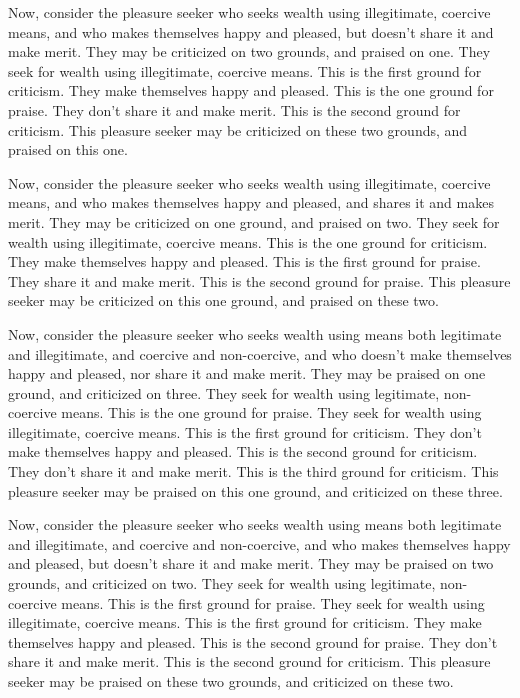 \documentclass[12pt,openany]{book}%
\begin{document}
Now, consider the pleasure seeker who seeks wealth using illegitimate, coercive means, and who makes themselves happy and pleased, but doesn’t share it and make merit. They may be criticized on two grounds, and praised on one. They seek for wealth using illegitimate, coercive means. This is the first ground for criticism. They make themselves happy and pleased. This is the one ground for praise. They don’t share it and make merit. This is the second ground for criticism. This pleasure seeker may be criticized on these two grounds, and praised on this one. 

Now, consider the pleasure seeker who seeks wealth using illegitimate, coercive means, and who makes themselves happy and pleased, and shares it and makes merit. They may be criticized on one ground, and praised on two. They seek for wealth using illegitimate, coercive means. This is the one ground for criticism. They make themselves happy and pleased. This is the first ground for praise. They share it and make merit. This is the second ground for praise. This pleasure seeker may be criticized on this one ground, and praised on these two. 

Now, consider the pleasure seeker who seeks wealth using means both legitimate and illegitimate, and coercive and non-coercive, and who doesn’t make themselves happy and pleased, nor share it and make merit. They may be praised on one ground, and criticized on three. They seek for wealth using legitimate, non-coercive means. This is the one ground for praise. They seek for wealth using illegitimate, coercive means. This is the first ground for criticism. They don’t make themselves happy and pleased. This is the second ground for criticism. They don’t share it and make merit. This is the third ground for criticism. This pleasure seeker may be praised on this one ground, and criticized on these three. 

Now, consider the pleasure seeker who seeks wealth using means both legitimate and illegitimate, and coercive and non-coercive, and who makes themselves happy and pleased, but doesn’t share it and make merit. They may be praised on two grounds, and criticized on two. They seek for wealth using legitimate, non-coercive means. This is the first ground for praise. They seek for wealth using illegitimate, coercive means. This is the first ground for criticism. They make themselves happy and pleased. This is the second ground for praise. They don’t share it and make merit. This is the second ground for criticism. This pleasure seeker may be praised on these two grounds, and criticized on these two. 
\end{document}
